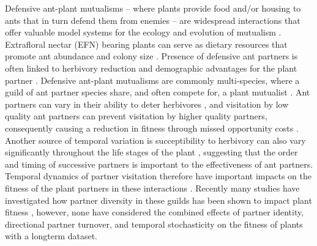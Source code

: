 \documentclass[11pt]{article}
\begin{document}
Defensive ant-plant mutualisms -- where plants provide food and/or housing to ants that in turn defend them from enemies -- are widespread interactions that offer valuable model systems for the ecology and evolution of mutualism \citep{Bronstein1998, Bronstein2006}. 
Extrafloral nectar (EFN) bearing plants can serve as dietary resources that promote ant abundance and colony size \citep{Byk2011, Ness2009, Ness2006}.
Presence of defensive ant partners is often linked to herbivory reduction \citep{Trager2010, Rudgers2010} and demographic advantages for the plant partner \citep{Baez2016}.
Defensive ant-plant mutualisms are commonly multi-species, where a guild of ant partner species share, and often compete for, a plant mutualist \citep{Bronstein1998, Beattie1985, Trager2010, Agrawal1998}.
Ant partners can vary in their ability to deter herbivores \citep{bruna2004}, and visitation by low quality ant partners can prevent visitation by higher quality partners, consequently causing a reduction in fitness through missed opportunity costs \citep{Fraser2001, Frederickson2005}.
Another source of temporal variation is succeptibility to herbivory can also vary significantly throughout the life stages of the plant \citep{Boege2005}, suggesting that the order and timing of successive partners is important to the effectiveness of ant partners.
Temporal dynamics of partner visitation therefore have important impacts on the fitness of the plant partners in these interactions \citep{Barton2010, Boege2005, Fonseca2003}.
Recently many studies have investigated how partner diversity in these guilds has been shown to impact plant fitness \citep{Palmer2010, Afkhami2014,Barrett2015, Ushio2020}, however, none have considered the combined effects of partner identity, directional partner turnover, and temporal stochasticity on the fitness of plants with a longterm dataset. 
	
\end{document}
